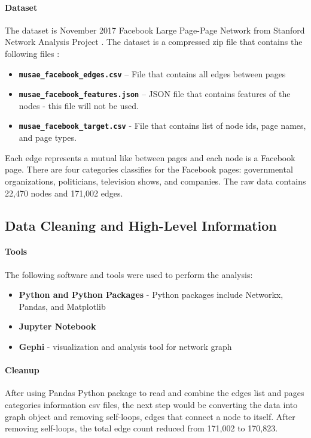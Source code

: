 \documentclass[11pt,twocolumn]{article}
\begin{document}
\paragraph{Dataset \cite{page-page-network-ds}}
The dataset is November 2017 Facebook Large Page-Page Network from Stanford Network Analysis Project \cite{page-page-network-ds}. The dataset is a compressed zip file that contains the following files :
\begin{itemize}
\item\textbf{\texttt{musae\_facebook\_edges.csv}} – File that contains all edges between pages
\item\textbf{\texttt{musae\_facebook\_features.json}} – JSON file that contains features of the nodes - this file will not be used.
\item\textbf{\texttt{musae\_facebook\_target.csv}} - File that contains list of node ids, page names, and page types.
\end{itemize}

Each edge represents a mutual like between pages and each node is a Facebook page. There are four categories classifies for the Facebook pages: governmental organizations, politicians, television shows, and companies. The raw data contains 22,470 nodes and 171,002 edges.

\subsection{Data Cleaning and High-Level Information}

\paragraph{Tools}
The following software and tools were used to perform the analysis:
\begin{itemize}
\item \textbf{Python and Python Packages} - Python packages include Networkx, Pandas, and Matplotlib
\item \textbf{Jupyter Notebook}
\item \textbf{Gephi} - visualization and analysis tool for network graph
\end{itemize}

\paragraph{Cleanup}
After using Pandas Python package to read and combine the edges list and pages categories information csv files, the next step would be converting the data into graph object and removing self-loops, edges that connect a node to itself. After removing self-loops, the total edge count reduced from 171,002 to 170,823.
\end{document}
